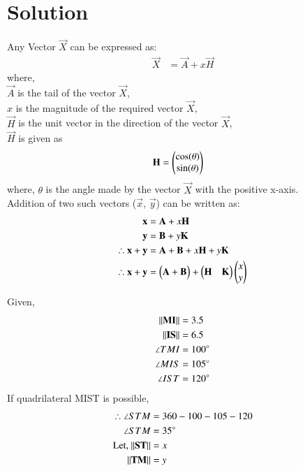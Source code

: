 \documentclass[journal,12pt,twocolumn]{IEEEtran}
\begin{document}
\section{Solution}
\begin{lemma}
    \label{lemma1}
    Any Vector $\vec{X}$ can be expressed as:
    \begin{align}
        \vec{X} &= \vec{A} + x\vec{H}
    \end{align}
    where,\\
    $\vec{A}$ is the tail of the vector $\vec{X}$,\\
    $x$ is the magnitude of the required vector $\vec{X}$,\\
    $\vec{H}$ is the unit vector in the direction of the vector $\vec{X}$,\\
    $\vec{H}$ is given as
    \begin{align}
        \mathbf{H} &= \begin{pmatrix}\cos(\theta)\\\sin(\theta)\end{pmatrix}
    \end{align}
    where, $\theta$ is the angle made by the vector $\vec{X}$ with the positive x-axis.
    \\ Addition of two such vectors ($\vec{x}$, $\vec{y}$) can be written as:
    \begin{align}
        \mathbf{x} &= \mathbf{A} + x\mathbf{H}\\
        \mathbf{y} &= \mathbf{B} + y\mathbf{K}\\
        \therefore \mathbf{x} + \mathbf{y} &= \mathbf{A} + \mathbf{B} + x\mathbf{H} + y\mathbf{K}\\
       \therefore \mathbf{x} + \mathbf{y} &= \begin{pmatrix}\mathbf{A} + \mathbf{B}\end{pmatrix} + \begin{pmatrix}\mathbf{H} & \mathbf{K}\end{pmatrix}\begin{pmatrix}x\\y\end{pmatrix}
    \end{align}
\end{lemma}
Given,
\begin{align}
    \lVert\mathbf{MI}\rVert &= 3.5\\
    \lVert\mathbf{IS}\rVert &= 6.5\\
    \angle{TMI} &= 100^{\circ}\\
    \angle{MIS} &= 105^{\circ}\\
    \angle{IST} &= 120^{\circ}\\
\end{align}
If quadrilateral MIST is possible,
\begin{align}
    \therefore \angle{STM} &= 360 - 100 - 105 - 120\\
    \angle{STM} &= 35^{\circ}\\
    \text{Let, } \lVert\mathbf{ST}\rVert &= x\\
    \lVert\mathbf{TM}\rVert &= y
\end{align}\\
\end{document}
